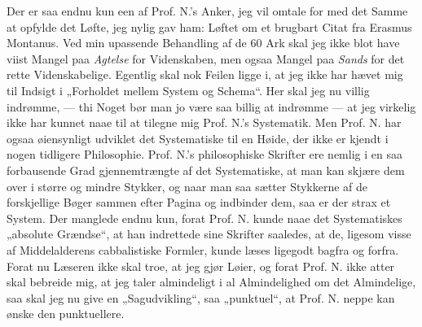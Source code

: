 \documentclass[12pt,a4paper]{book}
\newcommand{\opage}[1]{\marginnote{\footnotesize\textit{[#1]}}}
\begin{document}
Der er saa endnu kun een af Prof. N.'s Anker, jeg vil omtale for med det Samme
at opfylde det Løfte, jeg nylig gav ham: Løftet om et brugbart Citat fra Erasmus
Montanus. Ved min upassende Behandling af de 60 Ark skal jeg ikke blot have viist
Mangel paa \emph{Agtelse} for Videnskaben, men ogsaa Mangel paa \emph{Sands} for
det rette Videnskabelige. Egentlig skal nok Feilen ligge i, at jeg ikke har hævet
mig til Indsigt i „Forholdet mellem System og Schema“. Her skal jeg nu villig
indrømme, --- thi Noget bør man jo være saa billig at indrømme --- at jeg
virkelig ikke har kunnet naae til at tilegne mig Prof. N.'s Systematik. Men
Prof. N. har ogsaa øiensynligt udviklet det Systematiske til en Høide, der ikke
er kjendt i nogen tidligere Philosophie. Prof. N.'s philosophiske Skrifter ere
nemlig i en saa forbausende Grad gjennemtrængte af det Systematiske, at man kan
skjære dem over i større og mindre Stykker, og naar man saa sætter Stykkerne af
de forskjellige Bøger sammen efter Pagina og indbinder dem, saa er der strax et
System. Der manglede endnu kun, forat Prof. N. kunde naae det Systematiskes
„absolute Grændse“, at han indrettede sine Skrifter saaledes, at de, ligesom
visse af Middelalderens cabbalistiske Formler, kunde læses ligegodt bagfra
\opage{24} \setcounter{footnote}{0}
og forfra. Forat nu Læseren ikke skal troe, at jeg gjør Løier, og forat Prof. N.
ikke atter skal bebreide mig, at jeg taler almindeligt i al Almindelighed om det
Almindelige, saa skal jeg nu give en „Sagudvikling“, saa „punktuel“, at Prof. N.
neppe kan ønske den punktuellere.
\end{document}
